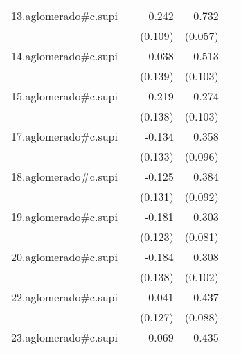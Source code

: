 {\begin{longtable}{l*{4}{D{.}{.}{-1}}}
\addlinespace
13.aglomerado#c.supi&                     &       0.242\sym{*}  &       0.732\sym{***}&                     \\
            &                     &     (0.109)         &     (0.057)         &                     \\
\addlinespace
14.aglomerado#c.supi&                     &       0.038         &       0.513\sym{***}&                     \\
            &                     &     (0.139)         &     (0.103)         &                     \\
\addlinespace
15.aglomerado#c.supi&                     &      -0.219         &       0.274\sym{**} &                     \\
            &                     &     (0.138)         &     (0.103)         &                     \\
\addlinespace
17.aglomerado#c.supi&                     &      -0.134         &       0.358\sym{***}&                     \\
            &                     &     (0.133)         &     (0.096)         &                     \\
\addlinespace
18.aglomerado#c.supi&                     &      -0.125         &       0.384\sym{***}&                     \\
            &                     &     (0.131)         &     (0.092)         &                     \\
\addlinespace
19.aglomerado#c.supi&                     &      -0.181         &       0.303\sym{***}&                     \\
            &                     &     (0.123)         &     (0.081)         &                     \\
\addlinespace
20.aglomerado#c.supi&                     &      -0.184         &       0.308\sym{**} &                     \\
            &                     &     (0.138)         &     (0.102)         &                     \\
\addlinespace
22.aglomerado#c.supi&                     &      -0.041         &       0.437\sym{***}&                     \\
            &                     &     (0.127)         &     (0.088)         &                     \\
\addlinespace
23.aglomerado#c.supi&                     &      -0.069         &       0.435\sym{***}&                     \\

\end{longtable}}
